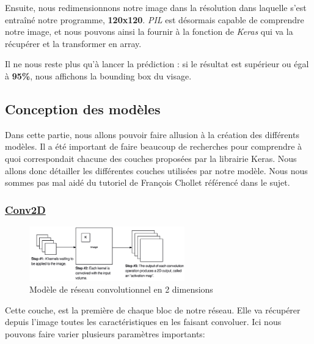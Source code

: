 \documentclass{rapport}
\begin{document}
            Ensuite, nous redimensionnons notre image dans la résolution dans laquelle s'est entraîné notre programme, \textbf{120x120}. \textit{PIL} est désormais capable de comprendre notre image, et nous pouvons ainsi la fournir à la fonction de \textit{Keras} qui va la récupérer et la transformer en array.
            
            Il ne nous reste plus qu'à lancer la prédiction : si le résultat est supérieur ou égal à \textbf{95\%}, nous affichons la bounding box du visage.
        
        \subsection{Conception des modèles}
        
        Dans cette partie, nous allons pouvoir faire allusion à la création des différents modèles. Il a été important de faire beaucoup de recherches pour comprendre à quoi correspondait chacune des couches proposées par la librairie Keras. Nous allons donc détailler les différentes couches utilisées par notre modèle. Nous nous sommes pas mal aidé du tutoriel\cite{classScratch} de François Chollet référencé dans le sujet.
        
            \subsubsection{\href{https://keras.io/api/layers/convolution_layers/convolution2d/}{Conv2D}}
            \begin{figure}[h]
                \centering
                \label{fig:conv2D}
                \includegraphics[width=0.6\textwidth]{rapport/plots/keras_conv2d_num_filters.png}
                \caption{Modèle de réseau convolutionnel en 2 dimensions}
            \end{figure}
            
            Cette couche, est la première de chaque bloc de notre réseau. Elle va récupérer depuis l'image toutes les caractéristiques en les faisant convoluer. Ici nous pouvons faire varier plusieurs paramètres importants\space:
            
\end{document}
